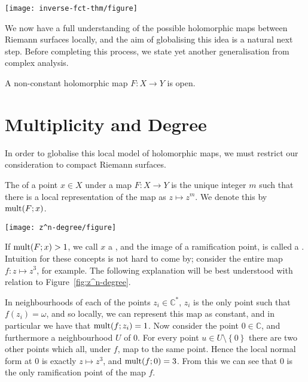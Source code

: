 \begin{marginfigure}[-15\baselineskip]
	\centering
	\texttt{[image: inverse-fct-thm/figure]}
	\caption{Lemma~\ref{lem:local-model-1} is an inverse function theorem type
		statement.}
\end{marginfigure}

We now have a full understanding of the possible holomorphic maps between
Riemann surfaces locally, and the aim of globalising this idea is a natural next
step. Before completing this process, we state yet another generalisation from
complex analysis.

\begin{corollary}
	A non-constant holomorphic map $ F:X \to Y $ is open.
\end{corollary}

\section{Multiplicity and Degree}
In order to globalise this local model of holomorphic maps, we must restrict our
consideration to compact Riemann surfaces.

\begin{definition}[Multiplicity]
	The  of a point $ x \in X $ under a map $ F:X \to Y $ is
	the unique integer $ m $ such that there is a local representation of the map
	as $ z \mapsto z^m $. We denote this by $ \operatorname{mult}(F;x) $.
\end{definition}

\begin{figure*}
	\centering
	\texttt{[image: z^n-degree/figure]}
	\caption{The only ramification point is at $ z=0 $.}
	\label{fig:z^n-degree}
\end{figure*}

If $ \operatorname{mult}(F;x) > 1 $, we call $ x $ a , and the
image of a ramification point, is called a . Intuition for
these concepts is not hard to come by; consider the entire map $ f:z \mapsto z^3
$, for example. The following explanation will be best understood with relation
to Figure~\ref{fig:z^n-degree}.

In neighbourhoods of each of the points $ z_i \in \mathbb{C}^{*} $, $ z_i $ is
the only point such that $ f(z_i) = \omega $, and so locally, we can represent
this map as constant, and in particular we have that $ \operatorname{mult}(f;z_{i}) = 1 $. Now
consider the point $ 0 \in \mathbb{C} $, and furthermore a neighbourhood $ U $
of $ 0 $. For every point $ u \in U \setminus \left\{ 0 \right\}$ there are two
other points which all, under $ f $, map to the same point. Hence the local
normal form at $ 0 $ is exactly $ z \mapsto z^3 $, and $ \operatorname{mult}(f;0)=3 $. From
this we can see that $ 0 $ is the only ramification point of the map $ f $.

